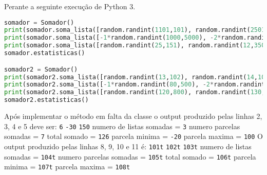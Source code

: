 \documentclass[12pt,varwidth=16cm,border=17pt]{standalone}
\begin{document}
Perante a seguinte execução de Python 3. 

\begin{lstlisting}[language=Python]
somador = Somador()
print(somador.soma_lista([random.randint(1101,101), random.randint(2501,200), random.randint(3350,300)]))
print(somador.soma_lista([-1*random.randint(1000,5000), -2*random.randint(2000, 8000)]))
print(somador.soma_lista([random.randint(25,151), random.randint(12,350)]))
somador.estatisticas()

somador2 = Somador()
print(somador2.soma_lista([random.randint(13,102), random.randint(14,103)]))
print(somador2.soma_lista([-1*random.randint(80,500), -2*random.randint(90, 600), -3*random.randint(110,700)]))
print(somador2.soma_lista([random.randint(120,800), random.randint(130,900), random.randint(140,1001), random.randint(160,1002)]))
somador2.estatisticas()
\end{lstlisting}



Após implementar o método em falta da classe o output produzido pelas linhas 2, 3, 4 e 5 deve ser:
\newline 
\verb+6+\newline
\verb+-30+\newline
\verb+150+\newline
numero de listas somadas = \verb+3+\newline
numero parcelas somadas  = \verb+7+\newline
total somado             = \verb+126+\newline
parcela minima           = \verb+-20+\newline
parcela maxima           = \verb+100+\newline
\newline
\newline
O output produzido pelas linhas 8, 9, 10 e 11 é:
\newline
\verb+101t+\newline
\verb+102t+\newline
\verb+103t+\newline
numero de listas somadas = \verb+104t+\newline
numero parcelas somadas  = \verb+105t+\newline
total somado             = \verb+106t+\newline
parcela minima           = \verb+107t+\newline
parcela maxima           = \verb+108t+\newline
\end{document}
